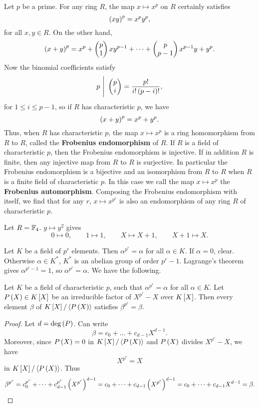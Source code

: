 Let $ p $ be a prime. For any ring $ R $, the map $ x \mapsto x^p $ on $ R $ certainly satisfies
$$ \rb{xy}^p = x^py^p, $$
for all $ x, y \in R $. On the other hand,
$$ \rb{x + y}^p = x^p + \twobyone{p}{1}xy^{p - 1} + \dots + \twobyone{p}{p - 1}x^{p - 1}y + y^p. $$
Now the binomial coefficients satisfy
$$ p \ \Bigg| \ \twobyone{p}{i} = \dfrac{p!}{i!\rb{p - i}!}, $$
for $ 1 \le i \le p - 1 $, so if $ R $ has characteristic $ p $, we have
$$ \rb{x + y}^p = x^p + y^p. $$
Thus, when $ R $ has characteristic $ p $, the map $ x \mapsto x^p $ is a ring homomorphism from $ R $ to $ R $, called the \textbf{Frobenius endomorphism} of $ R $. If $ R $ is a field of characteristic $ p $, then the Frobenius endomorphism is injective. If in addition $ R $ is finite, then any injective map from $ R $ to $ R $ is surjective. In particular the Frobenius endomorphism is a bijective and an isomorphism from $ R $ to $ R $ when $ R $ is a finite field of characteristic $ p $. In this case we call the map $ x \mapsto x^p $ the \textbf{Frobenius automorphism}. Composing the Frobenius endomorphism with itself, we find that for any $ r $, $ x \mapsto x^{p^r} $ is also an endomorphism of any ring $ R $ of characteristic $ p $.

\begin{example*}
Let $ R = \F_4 $. $ y \mapsto y^2 $ gives
$$ 0 \mapsto 0, \qquad 1 \mapsto 1, \qquad X \mapsto X + 1, \qquad X + 1 \mapsto X. $$
\end{example*}

Let $ K $ be a field of $ p^r $ elements. Then $ \alpha^{p^r} = \alpha $ for all $ \alpha \in K $. If $ \alpha = 0 $, clear. Otherwise $ \alpha \in K^* $, $ K^* $ is an abelian group of order $ p^r - 1 $. Lagrange's theorem gives $ \alpha^{p^r - 1} = 1 $, so $ \alpha^{p^r} = \alpha $. We have the following.

\begin{proposition}
Let $ K $ be a field of characteristic $ p $, such that $ \alpha^{p^r} = \alpha $ for all $ \alpha \in K $. Let $ P\rb{X} \in K\sb{X} $ be an irreducible factor of $ X^{p^r} - X $ over $ K\sb{X} $. Then every element $ \beta $ of $ K\sb{X} / \ab{P\rb{X}} $ satisfies $ \beta^{p^r} = \beta $.
\end{proposition}

\begin{proof}
Let $ d = \deg\rb{P} $. Can write
$$ \beta = c_0 + \dots + c_{d - 1}X^{d - 1}. $$
Moreover, since $ P\rb{X} = 0 $ in $ K\sb{X} / \ab{P\rb{X}} $ and $ P\rb{X} $ divides $ X^{p^r} - X $, we have
$$ X^{p^r} = X $$
in $ K\sb{X} / \ab{P\rb{X}} $. Thus
$$ \beta^{p^r} = c_0^{p^r} + \dots + c_{d - 1}^{p^r}\rb{X^{p^r}}^{d - 1} = c_0 + \dots + c_{d - 1}\rb{X^{p^r}}^{d - 1} = c_0 + \dots + c_{d - 1}X^{d - 1} = \beta. $$
\end{proof}

